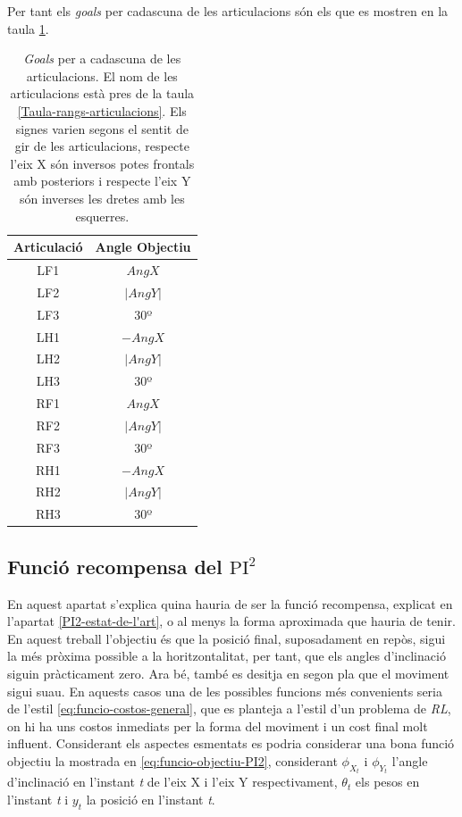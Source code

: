 \documentclass[12pt,a4paper,final,twoside]{report}
\begin{document}
Per tant els \textit{goals} per cadascuna de les articulacions són els que es mostren en la taula \ref{tab:goals-articulacions}.

\begin{table}[h]
\centering
\begin{tabular}{|c|c|}
\hline
Articulació & Angle Objectiu\\
\hline
\hline
 LF1 & $Ang X$ \\
 LF2 & $|Ang Y|$ \\
 LF3 & 30º  \\
 LH1 & $- Ang X$ \\
 LH2 & $|Ang Y|$ \\
 LH3 & 30º \\
 RF1 & $Ang X$ \\
 RF2 & $|Ang Y|$ \\
 RF3 & 30º \\
 RH1 & $- Ang X$ \\
 RH2 & $|Ang Y|$ \\
 RH3 & 30º \\
 \hline
\end{tabular}
\caption[\textit{Goals} per a cadascuna de les articulacions]{\textit{Goals} per a cadascuna de les articulacions. El nom de les articulacions està pres de la taula \ref{Taula-rangs-articulacions}. Els signes varien segons el sentit de gir de les articulacions, respecte l'eix X són inversos potes frontals amb posteriors i respecte l'eix Y són inverses les dretes amb les esquerres.}
\label{tab:goals-articulacions}
\end{table}


\subsection{Funció recompensa del $\mathrm{PI^2}$}

En aquest apartat s'explica quina hauria de ser la funció recompensa, explicat en l'apartat \ref{PI2-estat-de-l'art}, o al menys la forma aproximada que hauria de tenir. En aquest treball l'objectiu és que la posició final, suposadament en repòs, sigui la més pròxima possible a la horitzontalitat, per tant, que els angles d'inclinació siguin pràcticament zero. Ara bé, també es desitja en segon pla que el moviment sigui suau. En aquests casos una de les possibles funcions més convenients seria de l'estil \eqref{eq:funcio-costos-general}, que es planteja a l'estil d'un problema de \textit{RL}, on hi ha uns costos inmediats per la forma del moviment i un cost final molt influent. Considerant els aspectes esmentats es podria considerar una bona funció objectiu la mostrada en \eqref{eq:funcio-objectiu-PI2}, considerant $\phi_{X_t}$ i $\phi_{Y_t}$ l'angle d'inclinació en l'instant \textit{t} de l'eix X i l'eix Y respectivament, $\theta_t$ els pesos en l'instant \textit{t} i $y_t$ la posició en l'instant \textit{t}. 
\end{document}
